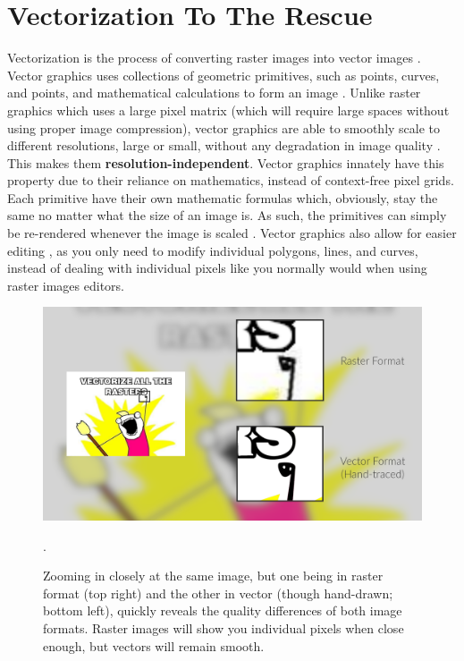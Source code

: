 \section{Vectorization To The Rescue}
Vectorization is the process of converting raster images into vector images \cite{effectiveclipartimagevectorization}. Vector graphics uses collections of geometric primitives, such as points, curves, and points, and mathematical calculations to form an image \cite{rastervsvector}. Unlike raster graphics which uses a large pixel matrix (which will require large spaces without using proper image compression), vector graphics are able to smoothly scale to different resolutions, large or small, without any degradation in image quality \cite{realtimevectorizationgpu}\cite{barendrecht2018locally}. This makes them \textbf{resolution-independent}. Vector graphics innately have this property due to their reliance on mathematics, instead of context-free pixel grids. Each primitive have their own mathematic formulas which, obviously, stay the same no matter what the size of an image is. As such, the primitives can simply be re-rendered whenever the image is scaled \cite{rastervsvector}\cite{rastervsvectorgraphics}. Vector graphics also allow for easier editing \cite{hoshyari2018perceptiondriven}\cite{optimizedgradientmeshes}, as you only need to modify individual polygons, lines, and curves, instead of dealing with individual pixels like you normally would when using raster images editors.

\begin{figure}[h]
	\centering
	\includegraphics[scale=1.0]{images/chap01-introduction/raster-vs-vector.png}
	\caption{Zooming in closely at the same image, but one being in raster format (top right) and the other in vector (though hand-drawn; bottom left), quickly reveals the quality differences of both image formats. Raster images will show you individual pixels when close enough, but vectors will remain smooth.}.
	\label{fig:raster-vs-vector}
\end{figure}


